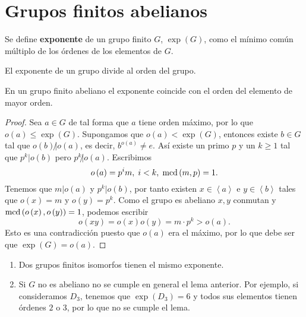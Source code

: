 \chapter{Grupos finitos abelianos}
\begin{definition}
Se define \textbf{exponente} de un grupo finito $\displaystyle G $, $\displaystyle \exp\left(G\right) $, como el mínimo común múltiplo de los órdenes de los elementos de $\displaystyle G $.
\end{definition}
\begin{observation}
El exponente de un grupo divide al orden del grupo. 
\end{observation}
\begin{lema}
En un grupo finito abeliano el exponente coincide con el orden del elemento de mayor orden. 
\end{lema}
\begin{proof}
Sea $\displaystyle a \in G $ de tal forma que $\displaystyle a $ tiene orden máximo, por lo que $\displaystyle o\left(a\right) \leq \exp\left(G\right) $. Supongamos que $\displaystyle o\left(a\right) < \exp\left(G\right) $, entonces existe $\displaystyle b \in G $ tal que $\displaystyle o\left(b\right) \not | o\left(a\right) $, es decir, $\displaystyle b^{o\left(a\right)} \neq e $. Así existe un primo $\displaystyle p $ y un $\displaystyle k \geq 1 $ tal que $\displaystyle p^{k} | o\left(b\right) $ pero $\displaystyle p^{k} \not | o\left(a\right) $. Escribimos 
\[o\left(a\right) = p^{i}m, \; i < k, \; \text{mcd}\left(m,p\right) = 1 .\]
Tenemos que $\displaystyle m | o\left(a\right) $ y $\displaystyle p^{k} | o\left(b\right) $, por tanto existen $\displaystyle x \in \left\langle a \right\rangle  $ e $\displaystyle y \in \left\langle b \right\rangle  $ tales que $\displaystyle o\left(x\right) = m $ y $\displaystyle o\left(y\right) = p^{k} $. Como el grupo es abeliano $\displaystyle x,y $ conmutan y $\displaystyle \text{mcd}\left(o\left(x\right), o\left(y\right)\right) = 1 $, podemos escribir
\[o\left(xy\right) = o\left(x\right)o\left(y\right) = m \cdot p^{k} > o\left(a\right) .\]
Esto es una contradicción puesto que $\displaystyle o\left(a\right) $ era el máximo, por lo que debe ser que $\displaystyle \exp\left(G\right) = o\left(a\right) $. 
\end{proof}
\begin{observation}
\begin{enumerate}
\item Dos grupos finitos isomorfos tienen el mismo exponente.
\item Si $\displaystyle G $ no es abeliano no se cumple en general el lema anterior. Por ejemplo, si consideramos $\displaystyle D_{3} $, tenemos que $\displaystyle  \exp\left(D_{3}\right)=6$ y todos sus elementos tienen órdenes $\displaystyle 2 $ o $\displaystyle 3 $, por lo que no se cumple el lema. 
\end{enumerate}	
\end{observation}
